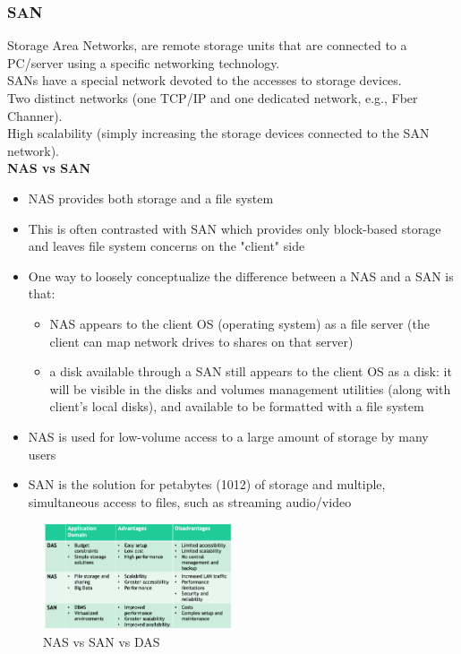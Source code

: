 \documentclass[10pt, oneside]{article}
\begin{document}
\subsubsection{SAN}
Storage Area Networks, are remote storage units that are connected to a PC/server using a specific networking technology.\\
SANs have a special network devoted to the accesses to storage devices.\\
Two distinct networks (one TCP/IP and one dedicated network, e.g., Fber Channer).\\
High scalability (simply increasing the storage devices connected to the SAN network).\\
\newline
{\bf NAS vs SAN}\\
\begin{itemize}
    \item NAS provides both storage and a file system
    \item This is often contrasted with SAN which provides only block-based storage and leaves file system concerns on the "client" side
    \item One way to loosely conceptualize the difference between a NAS and a SAN is that:
    \begin{itemize}
        \item NAS appears to the client OS (operating system) as a file server (the client can map network drives to shares on that server)
        \item a disk available through a SAN still appears to the client OS as a disk: it will be visible in the disks and volumes management utilities (along with client's local disks), and available to be formatted with a file system
    \end{itemize}
    \item NAS is used for low-volume access to a large amount of storage by many users
    \item SAN is the solution for petabytes (1012) of storage and multiple, simultaneous access to files, such as streaming audio/video
\end{itemize}

\begin{figure}[H]
    \begin{center}
    \includegraphics[width=0.5\textwidth]{img/img20.png}
    \caption{NAS vs SAN vs DAS}
    \label{fig:NAS,SAN,DAS}
    \end{center}
\end{figure}




\newpage

\end{document}

